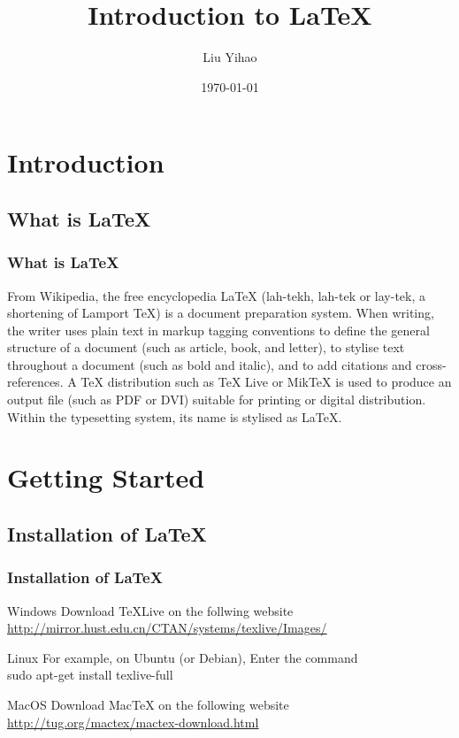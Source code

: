 \documentclass{beamer}
\title{Introduction to \LaTeX}
\author{Liu Yihao}
\date{\today}
\begin{document}
\begin{frame}
	\titlepage	
\end{frame}

\section{Introduction}
\begin{frame}
\end{frame}

\subsection{What is \LaTeX}

\begin{frame}
	\frametitle{What is \LaTeX}
	\begin{block}{From Wikipedia, the free encyclopedia}
		LaTeX (lah-tekh, lah-tek or lay-tek, a shortening of Lamport TeX) is a document preparation system. When writing, the writer uses plain text in markup tagging conventions to define the general structure of a document (such as article, book, and letter), to stylise text throughout a document (such as bold and italic), and to add citations and cross-references. A TeX distribution such as TeX Live or MikTeX is used to produce an output file (such as PDF or DVI) suitable for printing or digital distribution. Within the typesetting system, its name is stylised as \LaTeX.
	\end{block}
\end{frame}

\section{Getting Started}
\begin{frame}
\end{frame}

\subsection{Installation of \LaTeX}
\begin{frame}
	\frametitle{Installation of \LaTeX}
	\begin{block}{Windows}
		Download TeXLive on the follwing website\\
		\href{http://mirror.hust.edu.cn/CTAN/systems/texlive/Images/}{\color{blue}\underline{http://mirror.hust.edu.cn/CTAN/systems/texlive/Images/}}
	\end{block}
	\begin{block}{Linux}
		For example, on Ubuntu (or Debian), Enter the command\\
		\alert{sudo apt-get install texlive-full}
	\end{block}
	\begin{block}{MacOS}
		Download MacTeX on the following website\\
		\href{http://tug.org/mactex/mactex-download.html}
		{\color{blue}\underline{http://tug.org/mactex/mactex-download.html}}
	\end{block}
\end{frame}
\end{document}
